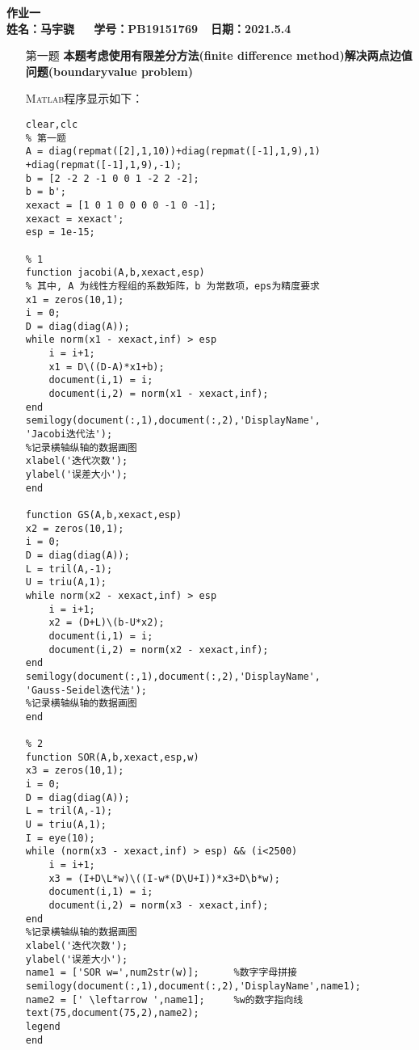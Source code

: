 \documentclass[12pt,a4paper,utf8]{ctexart}
\begin{document}


\begin{center}
\textbf{作业一}\\
\textbf{姓名：马宇骁~~~学号：PB19151769~~日期：2021.5.4}\\
\end{center}

\begin{center}
\fbox{
\begin{minipage}{40em}
\vspace{5cm}
\hspace{20cm}
\end{minipage}}
\end{center}
\vspace{1cm}



\begin{enumerate}
\item[第一题] \textbf{本题考虑使用有限差分方法(finite difference method)解决两点边值问题(boundaryvalue problem)}  

\textsc{Matlab}程序显示如下：
\begin{lstlisting}[frame=single]
clear,clc
% 第一题
A = diag(repmat([2],1,10))+diag(repmat([-1],1,9),1)
+diag(repmat([-1],1,9),-1);
b = [2 -2 2 -1 0 0 1 -2 2 -2];
b = b';
xexact = [1 0 1 0 0 0 0 -1 0 -1];
xexact = xexact';
esp = 1e-15;

% 1
function jacobi(A,b,xexact,esp)
% 其中, A 为线性方程组的系数矩阵，b 为常数项，eps为精度要求
x1 = zeros(10,1);
i = 0;
D = diag(diag(A));
while norm(x1 - xexact,inf) > esp
    i = i+1;
    x1 = D\((D-A)*x1+b);
    document(i,1) = i;
    document(i,2) = norm(x1 - xexact,inf);
end
semilogy(document(:,1),document(:,2),'DisplayName',
'Jacobi迭代法');
%记录横轴纵轴的数据画图
xlabel('迭代次数');
ylabel('误差大小');
end

function GS(A,b,xexact,esp)
x2 = zeros(10,1);
i = 0;
D = diag(diag(A));
L = tril(A,-1);
U = triu(A,1);
while norm(x2 - xexact,inf) > esp
    i = i+1;
    x2 = (D+L)\(b-U*x2);
    document(i,1) = i;
    document(i,2) = norm(x2 - xexact,inf);
end
semilogy(document(:,1),document(:,2),'DisplayName',
'Gauss-Seidel迭代法');
%记录横轴纵轴的数据画图
end

% 2
function SOR(A,b,xexact,esp,w)
x3 = zeros(10,1);
i = 0;
D = diag(diag(A));
L = tril(A,-1);
U = triu(A,1);
I = eye(10);
while (norm(x3 - xexact,inf) > esp) && (i<2500)
    i = i+1;
    x3 = (I+D\L*w)\((I-w*(D\U+I))*x3+D\b*w);
    document(i,1) = i;
    document(i,2) = norm(x3 - xexact,inf);
end
%记录横轴纵轴的数据画图
xlabel('迭代次数');
ylabel('误差大小');
name1 = ['SOR w=',num2str(w)];      %数字字母拼接
semilogy(document(:,1),document(:,2),'DisplayName',name1);
name2 = [' \leftarrow ',name1];     %w的数字指向线
text(75,document(75,2),name2);
legend
end


\end{lstlisting}
\end{enumerate}
\end{document}
